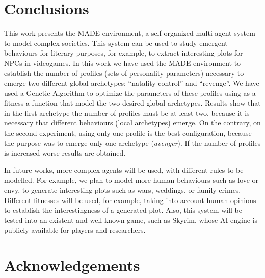 \documentclass[runningheads]{llncs}
\begin{document}



\section{Conclusions}
\label{sec:conclusion}

This work presents the MADE environment, a self-organized multi-agent system to model complex societies. This system can be used to study emergent behaviours for literary purposes, for example, to extract interesting plots for NPCs in videogames. In this work we have used the MADE environment to establish the number of profiles (sets of personality parameters) necessary to emerge two different global archetypes: ``natality control'' and ``revenge''. We have used a Genetic Algorithm to optimize the parameters of these profiles using as a fitness a function that model the two desired global archetypes. Results show that in the first archetype the number of profiles must be at least two, because it is necessary that different behaviours (local archetypes) emerge. On the contrary, on the second experiment, using only one profile is the best configuration, because the purpose was to emerge only one archetype ({\em avenger}). If the number of profiles is increased worse results are obtained.

In future works, more complex agents will be used, with different rules to be modelled. For example, we plan to model more human behaviours such as love or envy, to generate interesting plots such as wars, weddings, or family crimes. Different fitnesses will be used, for example, taking into account human opinions to establish the interestingness of a generated plot. Also, this system will be tested into an existent and well-known game, such as Skyrim\texttrademark, whose AI engine is publicly available for players and researchers.


\section*{Acknowledgements}



\end{document}
